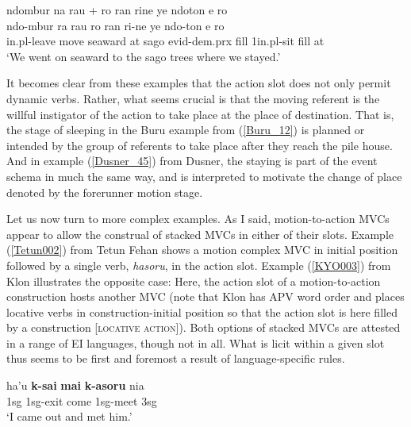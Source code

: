 \ea \label{Dusner_45}
\gll ndombur na rau + ro ran rine ye ndoton e ro \\
ndo-mbur ra rau ro ran ri-ne ye ndo-ton e ro \\
\acs{in}.\acs{pl}-leave move seaward at sago \acs{evid}-\acs{dem}.\acs{prx} \acs{fill} 1\acs{in}.\acs{pl}-sit \acs{fill} at \\
\glft `We went on seaward to the sago trees where we stayed.' \\ 
\z
\xe

It becomes clear from these examples that the action slot does not only permit dynamic verbs. Rather, what seems crucial is that the moving referent is the willful instigator of the action to take place at the place of destination. That is, the stage of sleeping in the Buru example from (\ref{Buru_12}) is planned or intended by the group of referents to take place after they reach the pile house. And in example (\ref{Dusner_45}) from Dusner, the staying is part of the event schema in much the same way, and is interpreted to motivate the change of place denoted by the forerunner motion stage.

Let us now turn to more complex examples. As I said, motion-to-action MVCs appear to allow the construal of stacked MVCs in either of their slots. Example (\ref{Tetun002}) from Tetun Fehan shows a motion complex MVC in initial position followed by a single verb, \textit{hasoru}, in the action slot. Example (\ref{KYO003}) from Klon illustrates the opposite case: Here, the action slot of a motion-to-action construction hosts another MVC (note that Klon has APV word order and places locative verbs in construction-initial position so that the action slot is here filled by a construction [\textsc{locative} \textsc{action}]). Both options of stacked MVCs are attested in a range of EI languages, though not in all. What is licit within a given slot thus seems to be first and foremost a result of language-specific rules.

\ea \label{Tetun002}
\gll ha'u \textbf{k-sai} \textbf{mai} \textbf{k-asoru} nia \\
\acs{1}\acs{sg} \acs{1}\acs{sg}-exit come \acs{1}\acs{sg}-meet \acs{3}\acs{sg} \\
\glft `I came out and met him.' \\ 
\z
\xe


